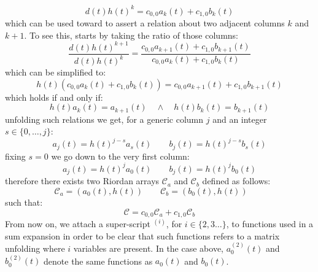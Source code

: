 \begin{equation} 
    d(t)h(t)^{k} = c_{0,0}a_{k}(t) + c_{1,0}b_{k}(t)
    \label{eq:two:splitted:catalan:generic:column:relation}
\end{equation} 
which can be used toward to assert a relation about two adjacent columns $k$ and $k+1$. 
To see this, starts by taking the ratio of those columns:
\begin{displaymath} 
    \frac{d(t)h(t)^{k+1}}{d(t)h(t)^{k}} = \frac{c_{0,0}a_{k+1}(t) + c_{1,0}b_{k+1}(t)}
        {c_{0,0}a_{k}(t) + c_{1,0}b_{k}(t)}
\end{displaymath} 
which can be simplified to:
\begin{displaymath} 
    h(t)\left(c_{0,0}a_{k}(t) + c_{1,0}b_{k}(t)\right) = 
        c_{0,0}a_{k+1}(t) + c_{1,0}b_{k+1}(t)
\end{displaymath} 
which holds if and only if:
\begin{displaymath} 
    h(t) a_{k}(t) = a_{k+1}(t) \quad \wedge \quad h(t) b_{k}(t) = b_{k+1}(t)
\end{displaymath} 
unfolding such relations we get, for a generic column $j$ and an integer $s\in\lbrace 0,\ldots,j\rbrace$:
\begin{displaymath} 
    a_{j}(t) = h(t)^{j-s} a_{s}(t) \quad \quad 
    b_{j}(t) = h(t)^{j-s} b_{s}(t)
\end{displaymath} 
fixing $s=0$ we go down to the very first column:
\begin{displaymath} 
    a_{j}(t) = h(t)^{j} a_{0}(t) \quad \quad 
    b_{j}(t) = h(t)^{j} b_{0}(t)
\end{displaymath} 
therefore there exists two Riordan arrays $\mathcal{C}_{a}$ and $\mathcal{C}_{b}$
defined as follows:
\begin{displaymath} 
    \mathcal{C}_{a} = \left(a_{0}(t), h(t)\right) \quad \quad 
    \mathcal{C}_{b} = \left(b_{0}(t), h(t)\right) \quad \quad 
\end{displaymath} 
such that:
\begin{equation} 
    \mathcal{C} = c_{0,0}\mathcal{C}_{a} + c_{1,0}\mathcal{C}_{b}
    \label{eq:two:splitted:catalan:riordan:expansion}
\end{equation} 
From now on, we attach a super-script $^{(i)}$, for $i\in\lbrace 2,3\ldots\rbrace$, 
to functions used in a sum expansion in order to be clear that such functions 
refers to a matrix unfolding where $i$ variables are present. In the case above, 
$a_{0}^{(2)}(t)$ and $b_{0}^{(2)}(t)$ denote the same functions as
$a_{0}(t)$ and $b_{0}(t)$.


